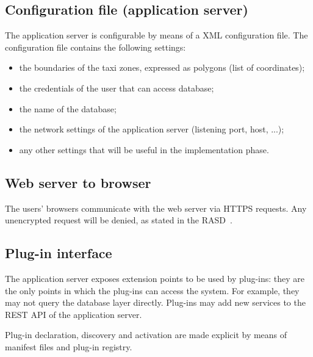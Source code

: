 \subsection{Configuration file (application server)}
\label{sec:config-file}
The application server is configurable by means of a XML configuration file.
The configuration file contains the following settings:
\begin{itemize}
    \item the boundaries of the taxi zones, expressed as polygons (list of coordinates);
    \item the credentials of the user that can access database;
    \item the name of the database;
    \item the network settings of the application server (listening port, host, ...);
    \item any other settings that will be useful in the implementation phase.
\end{itemize}

\subsection{Web server to browser}
\label{sec:server-to-browser}
The users' browsers communicate with the web server via HTTPS requests. Any unencrypted request will be denied, as stated in the RASD~\cite{rasd}.

\subsection{Plug-in interface}
\label{sec:plug-in-interface}
The application server exposes extension points to be used by plug-ins: they are the only points in which the plug-ins can access the system. For example, they may not query the database layer directly.
Plug-ins may add new services to the REST API of the application server.

Plug-in declaration, discovery and activation are made explicit by means of manifest files and plug-in registry.
